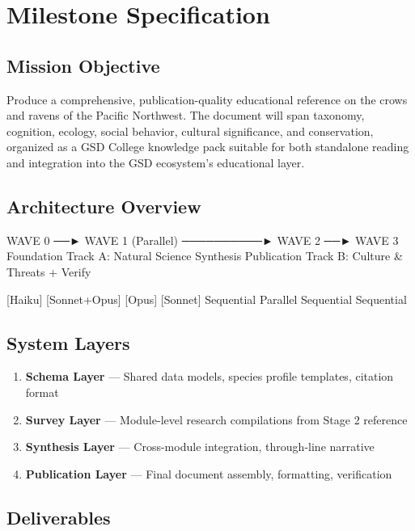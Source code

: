 \documentclass[11pt,letterpaper]{article}
\begin{document}
\section{Milestone Specification}

\subsection{Mission Objective}

Produce a comprehensive, publication-quality educational reference on the crows and ravens of the Pacific Northwest. The document will span taxonomy, cognition, ecology, social behavior, cultural significance, and conservation, organized as a GSD College knowledge pack suitable for both standalone reading and integration into the GSD ecosystem's educational layer.

\subsection{Architecture Overview}

\begin{asciibox}
  WAVE 0 ──► WAVE 1 (Parallel) ──────────► WAVE 2 ──► WAVE 3
  Foundation   Track A: Natural Science      Synthesis   Publication
               Track B: Culture & Threats                + Verify

  [Haiku]     [Sonnet+Opus]                 [Opus]     [Sonnet]
  Sequential   Parallel                     Sequential  Sequential
\end{asciibox}

\subsection{System Layers}

\begin{enumerate}[leftmargin=2em]
  \item \textbf{Schema Layer} --- Shared data models, species profile templates, citation format
  \item \textbf{Survey Layer} --- Module-level research compilations from Stage 2 reference
  \item \textbf{Synthesis Layer} --- Cross-module integration, through-line narrative
  \item \textbf{Publication Layer} --- Final document assembly, formatting, verification
\end{enumerate}

\subsection{Deliverables}
\end{document}
